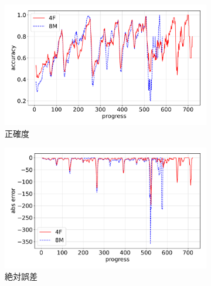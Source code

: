 \begin{figure}[t]
\centering
\begin{subfigure}[b]{0.8\linewidth}
    \includegraphics[width=\linewidth]{pdf/compare/EXP6_NT4F_and_NT8M/accuracy.pdf}
    \caption{正確度}
    \label{fig:EXP6_:NT4F_and_NT8M_accuracy}
\end{subfigure}
\begin{subfigure}[b]{0.8\linewidth}
    \includegraphics[width=\linewidth]{pdf/compare/EXP6_NT4F_and_NT8M/error_abs.pdf}
    \caption{絶対誤差}
    \label{fig:EXP6_NT4F_and_NT8M_error_abs_diff}
\end{subfigure}
\begin{subfigure}[b]{0.8\linewidth}

\end{subfigure}
\end{figure}
